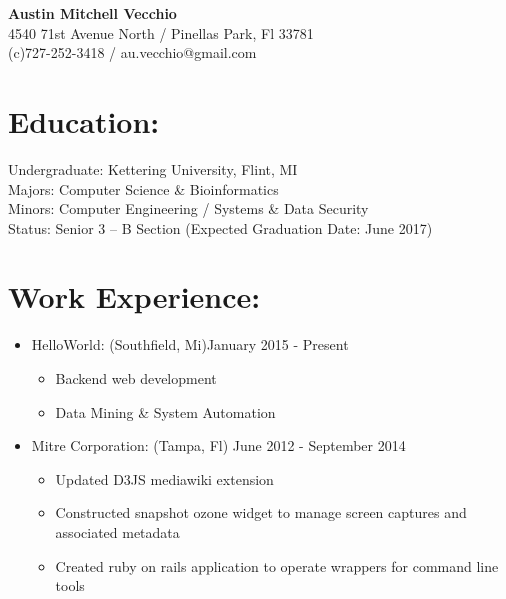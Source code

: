 \documentclass{res}
\begin{document}
\begin{center}
\LARGE{\textbf{Austin Mitchell Vecchio}}\\
\normalsize{
4540 71st Avenue North / Pinellas Park, Fl 33781\\
(c)727-252-3418 / au.vecchio@gmail.com
}
\end{center}

\section{Education:}
Undergraduate: Kettering University, Flint, MI\\
Majors: Computer Science \& Bioinformatics\\
Minors: Computer Engineering / Systems \& Data Security\\
Status: Senior 3 – B Section (Expected Graduation Date: June 2017)

\section{Work Experience:}
\begin{itemize}[leftmargin=*]
\item HelloWorld: (Southfield, Mi)\hfill January 2015 - Present
\begin{itemize}[label=$\circ$]
\item Backend web development
\item Data Mining \& System Automation
\end{itemize}
\item Mitre Corporation: (Tampa, Fl) \hfill June 2012 - September 2014
\begin{itemize}[label=$\circ$]
\item Updated D3JS mediawiki extension
\item Constructed snapshot ozone widget to manage screen captures and associated metadata
\item Created ruby on rails application to operate wrappers for command line tools
\end{itemize}
\end{itemize}
\end{document}
